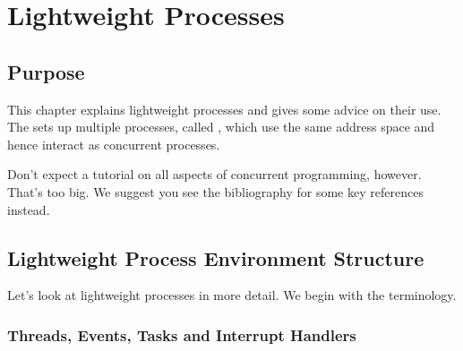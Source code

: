 %
%
%
%

\chapter{Lightweight Processes}
\label{lwpchapter}

\section{Purpose}

This chapter explains lightweight processes and gives some advice
on their use.  The  sets up
multiple processes, called , which use the same address
space and hence interact as concurrent processes.

Don't expect a tutorial on all aspects of concurrent programming, however.
That's too big.  We suggest you see the bibliography for some key references 
instead.

\section{Lightweight Process Environment Structure}
\label{structure}

Let's look at lightweight processes in more detail.  We begin with the 
terminology.

\subsection{Threads, Events, Tasks and Interrupt Handlers}

